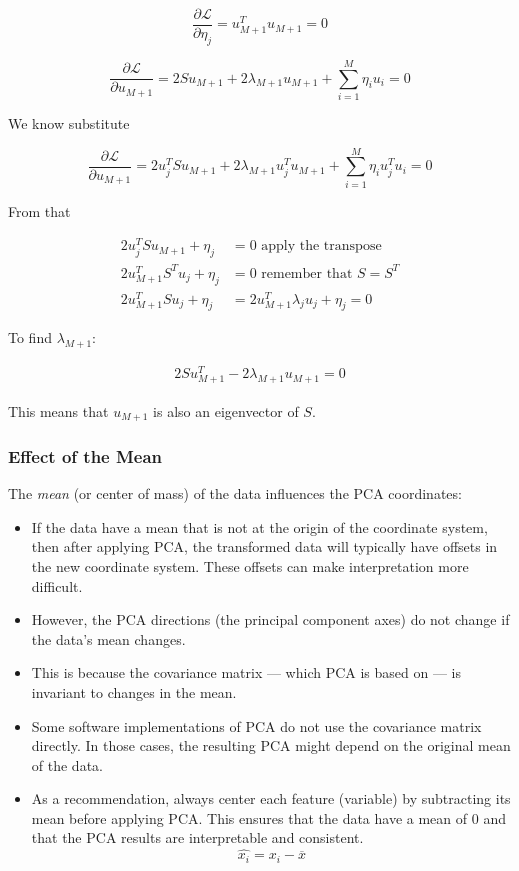 \[
    \frac{\partial \mathcal{L}}{\partial \eta_j } = u_{M + 1}^T  u_{M + 1} = 0
\]

\[
    \frac{\partial \mathcal{L}}{\partial u_{M + 1} } = 2Su_{M + 1}  + 2\lambda_{M + 1} u_{M + 1} + \sum_{i = 1}^{M} \eta_i u_{i} = 0
\]

We know substitute 

\[
    \frac{\partial \mathcal{L}}{\partial u_{M + 1} } = 2u_j^TSu_{M + 1}  + 2\lambda_{M + 1}u_j^T u_{M + 1} + \sum_{i = 1}^{M} \eta_i u_{j}^T u_{i} = 0
\]

From that

\begin{align*}
    2u_j^TSu_{M + 1} + \eta_j &= 0 \text{ apply  the transpose }\\ 
    2u_{M + 1}^T S^T u_j + \eta_j &= 0 \text{ remember that } S = S^T\\ 
    2u_{M + 1}^T S u_j + \eta_j &=  2u_{M + 1}^T \lambda_j u_j + \eta_j = 0 
\end{align*}

To find \(\lambda_{M + 1}\):

\begin{align*}
    2 S u_{M + 1}^T - 2 \lambda_{M + 1} u_{M + 1} = 0
\end{align*}

This means that \(u_{M + 1}\) is also an eigenvector of \(S\).

\subsubsection{Effect of the Mean}

The \emph{mean} (or center of mass) of the data influences the PCA coordinates:

\begin{itemize}

    \item If the data have a mean that is not at the origin of the coordinate system, then after applying PCA, the transformed data will typically have offsets in the new coordinate system. 
    These offsets can make interpretation more difficult.

    \item However, the PCA directions (the principal component axes) do not change if the data’s mean changes.

    \item This is because the covariance matrix — which PCA is based on — is invariant to changes in the mean.

    \item Some software implementations of PCA do not use the covariance matrix directly. 
    In those cases, the resulting PCA might depend on the original mean of the data. 

    \item As a recommendation, always center each feature (variable) by subtracting its mean before applying PCA. This ensures that the data have a mean 
    of 0 and that the PCA results are interpretable and consistent. 
    \[
        \hat{x_i} = x_i - \overline{x}
    \]

\end{itemize}


